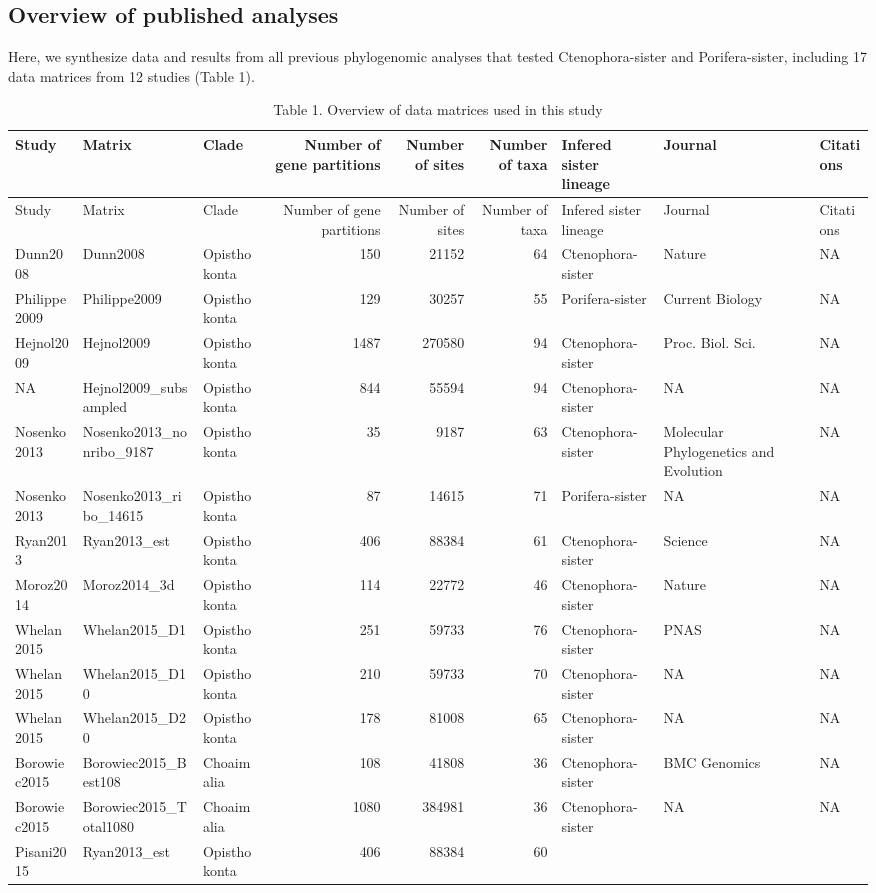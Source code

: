 \documentclass[]{article}
\begin{document}
\hypertarget{overview-of-published-analyses}{%
\subsection{Overview of published
analyses}\label{overview-of-published-analyses}}

Here, we synthesize data and results from all previous phylogenomic
analyses that tested Ctenophora-sister and Porifera-sister, including 17
data matrices from 12 studies (Table 1).

\begin{longtable}[]{@{}lllrrrlll@{}}
\caption{Table 1. Overview of data matrices used in this
study}\tabularnewline
\toprule
Study & Matrix & Clade & Number of gene partitions & Number of sites &
Number of taxa & Infered sister lineage & Journal &
Citations\tabularnewline
\midrule
\endfirsthead
\toprule
Study & Matrix & Clade & Number of gene partitions & Number of sites &
Number of taxa & Infered sister lineage & Journal &
Citations\tabularnewline
\midrule
\endhead
Dunn2008 & Dunn2008 & Opisthokonta & 150 & 21152 & 64 &
Ctenophora-sister & Nature & NA\tabularnewline
Philippe2009 & Philippe2009 & Opisthokonta & 129 & 30257 & 55 &
Porifera-sister & Current Biology & NA\tabularnewline
Hejnol2009 & Hejnol2009 & Opisthokonta & 1487 & 270580 & 94 &
Ctenophora-sister & Proc. Biol. Sci. & NA\tabularnewline
NA & Hejnol2009\_subsampled & Opisthokonta & 844 & 55594 & 94 &
Ctenophora-sister & NA & NA\tabularnewline
Nosenko2013 & Nosenko2013\_nonribo\_9187 & Opisthokonta & 35 & 9187 & 63
& Ctenophora-sister & Molecular Phylogenetics and Evolution &
NA\tabularnewline
Nosenko2013 & Nosenko2013\_ribo\_14615 & Opisthokonta & 87 & 14615 & 71
& Porifera-sister & NA & NA\tabularnewline
Ryan2013 & Ryan2013\_est & Opisthokonta & 406 & 88384 & 61 &
Ctenophora-sister & Science & NA\tabularnewline
Moroz2014 & Moroz2014\_3d & Opisthokonta & 114 & 22772 & 46 &
Ctenophora-sister & Nature & NA\tabularnewline
Whelan2015 & Whelan2015\_D1 & Opisthokonta & 251 & 59733 & 76 &
Ctenophora-sister & PNAS & NA\tabularnewline
Whelan2015 & Whelan2015\_D10 & Opisthokonta & 210 & 59733 & 70 &
Ctenophora-sister & NA & NA\tabularnewline
Whelan2015 & Whelan2015\_D20 & Opisthokonta & 178 & 81008 & 65 &
Ctenophora-sister & NA & NA\tabularnewline
Borowiec2015 & Borowiec2015\_Best108 & Choaimalia & 108 & 41808 & 36 &
Ctenophora-sister & BMC Genomics & NA\tabularnewline
Borowiec2015 & Borowiec2015\_Total1080 & Choaimalia & 1080 & 384981 & 36
& Ctenophora-sister & NA & NA\tabularnewline
Pisani2015 & Ryan2013\_est & Opisthokonta & 406 & 88384 & 60 &

\end{longtable}
\end{document}
